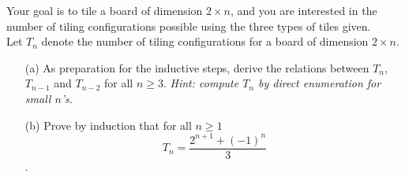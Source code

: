 \documentclass[11pt]{article}
\newif\ifsolutions
\newcommand{\sketch}{\textbf{Solution sketch:}}
\begin{document}
\begin{qunlist}
Your goal is to tile a board of dimension $2 \times n$, and you are interested in the number of
tiling configurations possible using the three types of tiles given. \\
Let $T_n$ denote the number of tiling configurations for a board of dimension $2 \times n$.
\begin{itemize}
\qpart
\item[(a)] As preparation for the inductive steps, derive the relations between $T_n$, $T_{n-1}$ 
and $T_{n-2}$ for all $n \geq 3$. \textit{Hint: compute $T_n$ by direct enumeration for small $n$'s.}

\ifsolutions
\sketch 
$T_n = T_{n-1} + 2T_{n-2}$ for all $n \geq 3$\\
We enumerate the tilings for a $2 \times n$ board by considering three cases depending on
the tile covering the bottom square of the first column. 
\begin{itemize}
\item[(i)] The tile is \textbf{A}: then the first two columns of the board must be tiled with \textbf{AA}.
The remaining $2 \times (n-2)$ board can be tiled in $T_{n-2}$ ways.
\item[(ii)] The tile is \textbf{B}: the first column is tiled with \textbf{A}, and
the remaining $2 \times (n-1)$ board can be tiled in $T_{n-1}$ ways.
\item[(iii)] The tile is \textbf{C}: the first two columns of the board are tiled with \textbf{C}, and
the remaining $2 \times (n-2)$ board can be tiled in $T_{n-2}$ ways.
\end{itemize}
Note that the three cases are exhaustive and mutually exclusive. The number of tilings for a $2 \times n$
board therefore satisfies the recurrence relation as proposed.
\fi

\qpart
\item[(b)] Prove by induction that for all $n \geq 1$
\[ T_n = \frac{2^{n+1}+(-1)^n}{3} \]. 


\end{itemize}
\end{qunlist}
\end{document}
